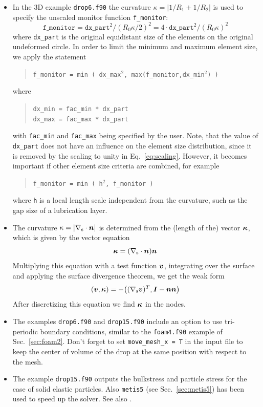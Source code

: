\begin{itemize}
\item In the 3D example \texttt{drop6.f90} the curvature $\kappa=|1/R_1+1/R_2|$ is used to specify the unscaled monitor function \texttt{f\_monitor}:
\[
    \texttt{f\_monitor}=  \texttt{dx\_part}^2/(R_0\kappa/2)^2=4\cdot\texttt{dx\_part}^2/(R_0\kappa)^2
\]
where \texttt{dx\_part} is the original equidistant size of the elements on the original undeformed circle. In order to limit the minimum and maximum element size, we apply the statement
\begin{quote}
    \texttt{f\_monitor = min ( dx\_max$^2$, max(f\_monitor,dx\_min$^2$) )}
\end{quote}
where
\begin{quote}
   \texttt{dx\_min = fac\_min * dx\_part}\\
   \texttt{dx\_max = fac\_max * dx\_part}
\end{quote}
with \texttt{fac\_min} and \texttt{fac\_max} being specified by the user. Note, that  the value of \texttt{dx\_part} does not have an influence on the element size distribution, since it is removed by the scaling to unity in Eq.~\eqref{eq:scaling}. However, it becomes important if other element size criteria are combined, for example
\begin{quote}
    \texttt{f\_monitor = min ( h$^2$, f\_monitor )}
\end{quote}
where \texttt{h} is a local length scale independent from the curvature, such as the gap size of a lubrication layer.
\item The curvature $\kappa=|\nabla_\text{s}\cdot\boldsymbol{n}|$ is determined from the (length of the) vector
$\boldsymbol{\kappa}$, which is given by the vector equation
\[
    \boldsymbol{\kappa} = (\nabla_\text{s}\cdot \boldsymbol{n} )\boldsymbol{n} 
\]
Multiplying this equation with a test function $\boldsymbol{v}$, integrating over the surface and applying the surface divergence theorem, we get the weak form
\[
    (\boldsymbol{v},\boldsymbol{\kappa}) = -\big((\nabla_\text{s}\boldsymbol{v})^T,\boldsymbol{I}-\boldsymbol{n}\boldsymbol{n}\big)
\]
After discretizing this equation we find $\boldsymbol{\kappa}$ in the nodes.

\item The examples \texttt{drop6.f90} and \texttt{drop15.f90} include an option to use tri-periodic boundary conditions, similar to the \texttt{foam4.f90} example of Sec.~\ref{sec:foam2}. Don't forget to set \texttt{move\_mesh\_x~=~T} in the input file to keep the center of volume of the drop at the same position with respect to the mesh.

\item The example \texttt{drop15.f90} outputs the bulkstress and particle stress for the case of solid elastic particles. Also \texttt{metis5} (see Sec.~\ref{sec:metis5}) has been used to speed up the solver. See also \cite{Carrozza2017}. 

\end{itemize}

